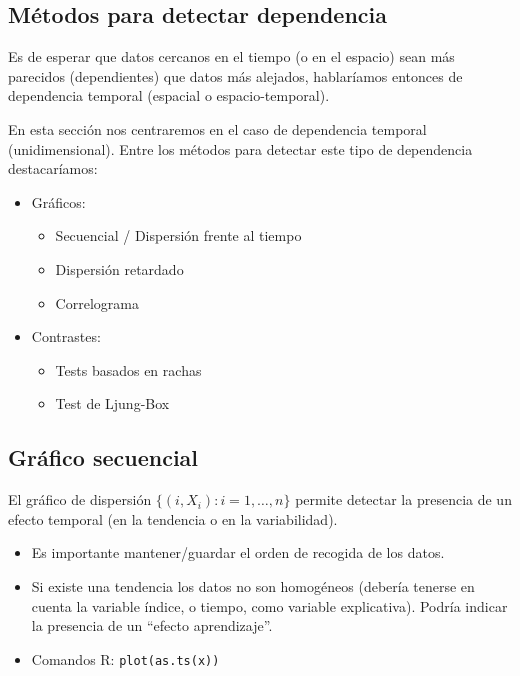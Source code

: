 \documentclass[
]{book}
\theoremstyle{break}
\theoremstyle{nonumberplain}
\begin{document}
\hypertarget{muxe9todos-para-detectar-dependencia}{%
\subsection{Métodos para detectar dependencia}\label{muxe9todos-para-detectar-dependencia}}

Es de esperar que datos cercanos en el tiempo (o en el espacio)
sean más parecidos (dependientes) que datos más alejados, hablaríamos entonces de dependencia temporal (espacial o espacio-temporal).

En esta sección nos centraremos en el caso de dependencia temporal (unidimensional).
Entre los métodos para detectar este tipo de dependencia destacaríamos:

\begin{itemize}
\item
  Gráficos:

  \begin{itemize}
  \item
    Secuencial / Dispersión frente al tiempo
  \item
    Dispersión retardado
  \item
    Correlograma
  \end{itemize}
\item
  Contrastes:

  \begin{itemize}
  \item
    Tests basados en rachas
  \item
    Test de Ljung-Box
  \end{itemize}
\end{itemize}

\hypertarget{gruxe1fico-secuencial}{%
\subsection{Gráfico secuencial}\label{gruxe1fico-secuencial}}

El gráfico de dispersión \(\{(i,X_{i}) : i = 1, \ldots, n \}\) permite detectar la presencia de un efecto temporal (en la tendencia o en la variabilidad).

\begin{itemize}
\item
  Es importante mantener/guardar el orden de recogida de los datos.
\item
  Si existe una tendencia los datos no son homogéneos (debería tenerse
  en cuenta la variable índice, o tiempo, como variable explicativa).
  Podría indicar la presencia de un ``efecto aprendizaje''.
\item
  Comandos R: \texttt{plot(as.ts(x))}
\end{itemize}
\end{document}
